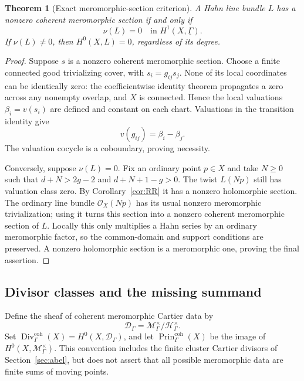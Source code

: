 \documentclass[11pt,letterpaper]{article}
\numberwithin{equation}{section}
\newtheorem{theorem}{Theorem}[section]
\theoremstyle{definition}
\theoremstyle{remark}
\newcommand{\HH}{\mathcal H}
\newcommand{\MM}{\mathscr M}
\newcommand{\OO}{\mathcal O}
\newcommand{\Div}{\operatorname{Div}}
\newcommand{\Prin}{\operatorname{Prin}}
\newcommand{\Hg}{\HH_\Gamma}
\newcommand{\Mg}{\MM_\Gamma}
\newcommand{\vclass}{\nu}
\begin{document}
\begin{theorem}[Exact meromorphic-section criterion]
\label{thm:meromorphic}
A Hahn line bundle $L$ has a nonzero coherent meromorphic section if and
only if
\begin{equation}
 \vclass(L)=0\quad\text{in }H^1(X,\underline\Gamma).
 \label{eq:meromorphiccriterion}
\end{equation}
If $\vclass(L)\ne0$, then $H^0(X,L)=0$, regardless of its degree.
\end{theorem}
\begin{proof}
Suppose $s$ is a nonzero coherent meromorphic section. Choose a finite
connected good trivializing cover, with $s_i=g_{ij}s_j$. None of its
local coordinates can be identically zero: the coefficientwise identity
theorem propagates a zero across any nonempty overlap, and $X$ is
connected. Hence the local valuations $\beta_i=v(s_i)$ are defined and
constant on each chart. Valuations in the transition identity give
\[
 v(g_{ij})=\beta_i-\beta_j.
\]
The valuation cocycle is a coboundary, proving necessity.

Conversely, suppose $\vclass(L)=0$. Fix an ordinary point $p\in X$
and take $N\ge0$ such that $d+N>2g-2$ and $d+N+1-g>0$.
The twist $L(Np)$ still has valuation class zero. By
Corollary~\ref{cor:RR} it has a nonzero holomorphic section. The ordinary
line bundle $\OO_X(Np)$ has its usual nonzero meromorphic trivialization;
using it turns this section into a nonzero coherent meromorphic section
of $L$. Locally this only multiplies a Hahn series by an ordinary
meromorphic factor, so the common-domain and support conditions are
preserved. A nonzero holomorphic section is a meromorphic one, proving
the final assertion.
\end{proof}

\subsection{Divisor classes and the missing summand}
Define the sheaf of coherent meromorphic Cartier data by
\[
 \mathscr D_\Gamma=\Mg^\times/\Hg^\times.
\]
Set $\Div_\Gamma^{\mathrm{coh}}(X)=H^0(X,\mathscr D_\Gamma)$, and let
$\Prin_\Gamma^{\mathrm{coh}}(X)$ be the image of
$H^0(X,\Mg^\times)$. This convention includes the finite cluster
Cartier divisors of Section~\ref{sec:abel}, but does not assert that
all possible meromorphic data are finite sums of moving points.
\end{document}
